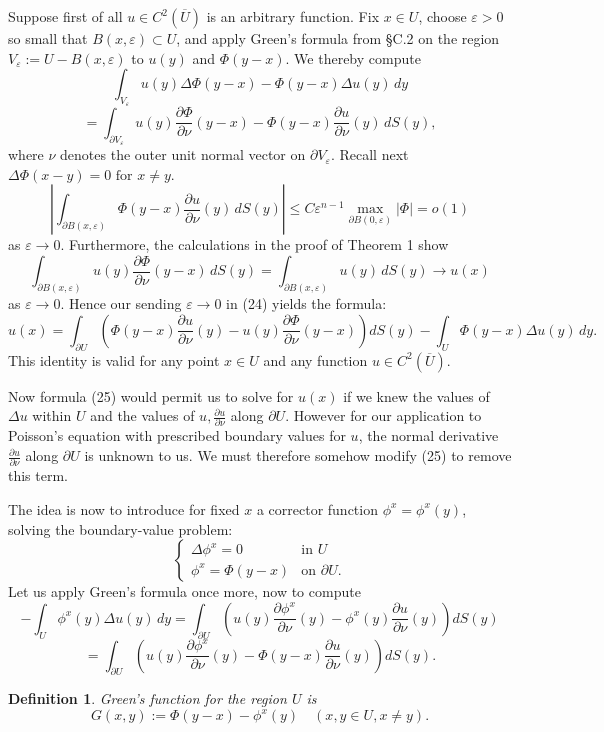 \documentclass[a4paper,12pt]{report}
\newtheorem{definition}{Definition}[section]
\begin{document}
Suppose first of all \( u \in C^2(\overline{U}) \) is an arbitrary function. Fix \( x \in U \), choose \( \varepsilon > 0 \) so small that \( B(x, \varepsilon) \subset U \), and apply Green's formula from \S C.2 on the region \( V_{\varepsilon} := U - B(x, \varepsilon) \) to \( u(y) \) and \( \Phi(y - x) \). We thereby compute
\[
\int_{V_{\varepsilon}} u(y) \Delta \Phi(y - x) - \Phi(y - x) \Delta u(y) \, dy 
\]
\[
= \int_{\partial V_{\varepsilon}} u(y) \frac{\partial \Phi}{\partial \nu} (y - x) - \Phi(y - x) \frac{\partial u}{\partial \nu} (y) \, dS(y), \tag{24}
\]
where $\nu$ denotes the outer unit normal vector on \(\partial V_\varepsilon\). Recall next  \(\Delta \Phi(x-y) = 0 \text{ for } x \neq y.\)
\[
\left| \int_{\partial B(x, \varepsilon)} \Phi(y - x) \frac{\partial u}{\partial \nu} (y) \, dS(y) \right| \leq C \varepsilon^{n-1} \max_{\partial B(0, \varepsilon)} |\Phi| = o(1)
\]
as \(\varepsilon \to 0\). Furthermore, the calculations in the proof of Theorem 1 show
\[
\int_{\partial B(x, \varepsilon)} u(y) \frac{\partial \Phi}{\partial \nu} (y - x) \, dS(y) = \int_{\partial B(x, \varepsilon)} u(y) \, dS(y) \to u(x)
\]
as \(\varepsilon \to 0\). Hence our sending \(\varepsilon \to 0\) in (24) yields the formula:
\[
u(x) = \int_{\partial U} \left( \Phi(y - x) \frac{\partial u}{\partial \nu} (y) - u(y) \frac{\partial \Phi}{\partial \nu} (y - x) \right) dS(y) - \int_U \Phi(y - x) \Delta u(y) \, dy. \tag{25}
\]
This identity is valid for any point \( x \in U \) and any function \( u \in C^2(\overline{U}) \).

Now formula (25) would permit us to solve for \( u(x) \) if we knew the values of \( \Delta u \) within \( U \) and the values of \( u, \frac{\partial u}{\partial \nu} \) along \( \partial U \). However for our application to Poisson's equation with prescribed boundary values for \( u \), the normal derivative \( \frac{\partial u}{\partial \nu} \) along \( \partial U \) is unknown to us. We must therefore somehow modify (25) to remove this term.

The idea is now to introduce for fixed \( x \) a corrector function \( \phi^x = \phi^x(y) \), solving the boundary-value problem:
\[
\begin{cases}
\Delta \phi^x = 0 & \text{in } U \\
\phi^x = \Phi(y - x) & \text{on } \partial U. \tag{26}
\end{cases}
\]
Let us apply Green’s formula once more, now to compute
\[
- \int_U \phi^x(y) \Delta u(y) \, dy = \int_{\partial U} \left( u(y) \frac{\partial \phi^x}{\partial \nu} (y) - \phi^x(y) \frac{\partial u}{\partial \nu} (y) \right) dS(y) \tag{27} \]
\[
= \int_{\partial U} \left( u(y) \frac{\partial \phi^x}{\partial \nu} (y) - \Phi(y - x) \frac{\partial u}{\partial \nu} (y) \right) dS(y).
\]
\begin{definition}
Green’s function for the region \( U \) is
\[
G(x, y) := \Phi(y - x) - \phi^x(y) \quad (x, y \in U, x \neq y).
\]
\end{definition}
\end{document}
